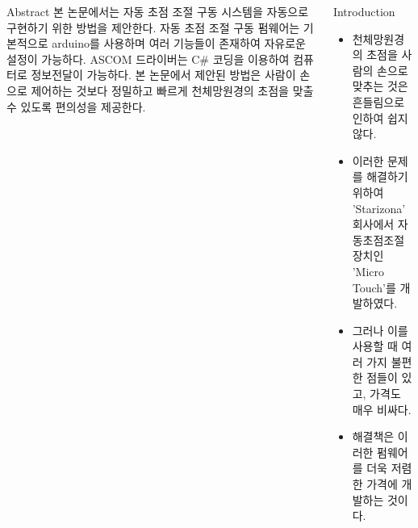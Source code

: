 \documentclass{gshs_poster_beamer}
\begin{document}
\pagestyle{fancy}
\maketitle

\begin{columns}[T]



\begin{posterbox}{Abstract}
본 논문에서는 자동 초점 조절 구동 시스템을 자동으로 구현하기 위한 방법을 제안한다. 자동 초점 조절 구동 펌웨어는 기본적으로 arduino를 사용하며 여러 기능들이 존재하여 자유로운 설정이 가능하다. ASCOM 드라이버는 C\# 코딩을 이용하여 컴퓨터로 정보전달이 가능하다. 본 논문에서 제안된 방법은 사람이 손으로 제어하는 것보다 정밀하고 빠르게 천체망원경의 초점을 맞출 수 있도록 편의성을 제공한다.
\end{posterbox}

\vspace{1em}

\begin{posterbox}{Introduction}
\begin{itemize}
	\item 천체망원경의 초점을 사람의 손으로 맞추는 것은 흔들림으로 인하여 쉽지 않다.
	\item 이러한 문제를 해결하기 위하여 'Starizona' 회사에서 자동초점조절 장치인 'Micro Touch'를 개발하였다.
	\item 그러나 이를 사용할 때 여러 가지 불편한 점들이 있고, 가격도 매우 비싸다.
	\item 해결책은 이러한 펌웨어를 더욱 저렴한 가격에 개발하는 것이다.
\end{itemize}
\end{posterbox}

\vspace{1em}


\end{columns}
\end{document}
